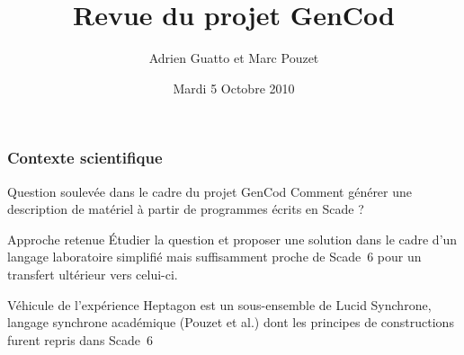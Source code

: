 \documentclass{beamer}
\title{Revue du projet GenCod}
\author{Adrien Guatto et Marc Pouzet}
\date{Mardi 5 Octobre 2010}
\newcommand{\lucy}{{\sc Lucid Synchrone}}
\newcommand{\scade}{{\sc Scade}}
\newcommand{\scadesix}{{\sc Scade~6}}
\newcommand{\heptagon}{{\sc Heptagon}}
\begin{document}

\begin{frame}[t,plain]
  \titlepage
\end{frame}

\begin{frame}
  \frametitle{Contexte scientifique}

  \begin{block}{Question soulevée dans le cadre du projet GenCod}
    Comment générer une description de matériel à partir de programmes écrits en
    \scade{} ?
  \end{block}

  \pause

  \begin{block}{Approche retenue}
    Étudier la question et proposer une solution dans le cadre d'un langage
    laboratoire simplifié mais suffisamment proche de \scadesix{} pour un
    transfert ultérieur vers celui-ci.
  \end{block}

  \pause

  \begin{block}{Véhicule de l'expérience}
    \heptagon{} est un sous-ensemble de \lucy{}, langage synchrone
    académique (Pouzet et al.) dont les principes de constructions furent repris
    dans \scadesix{}
  \end{block}
\end{frame}
\end{document}
